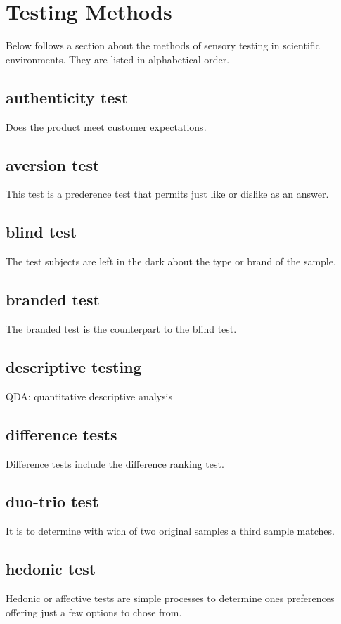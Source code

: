 \documentclass[]{scrartcl}
\begin{document}
\section{Testing Methods}
Below follows a section about the methods of sensory testing in scientific environments.
They are listed in alphabetical order.
\subsection{authenticity test}
Does the product meet customer expectations.

\subsection{aversion test}
This test is a prederence test that permits just like or dislike as an answer.

\subsection{blind test}
The test subjects are left in the dark about the type or brand of the sample.

\subsection{branded test}
The branded test is the counterpart to the blind test.

\subsection{descriptive testing}
QDA: quantitative descriptive analysis

\subsection{difference tests}
Difference tests include the difference ranking test.

\subsection{duo-trio test}
It is to determine with wich of two original samples a third sample matches.

\subsection{hedonic test}
Hedonic or affective tests are simple processes to determine ones preferences offering
just a few options to chose from.
\end{document}
